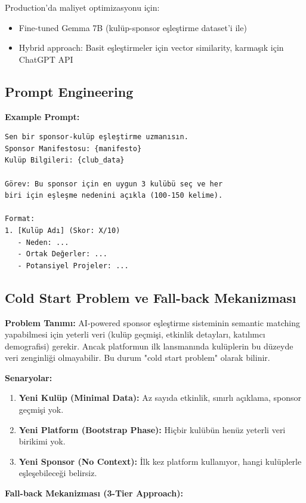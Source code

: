 \documentclass[a4paper,12pt]{report}
\begin{document}
Production'da maliyet optimizasyonu için:
\begin{itemize}
    \item Fine-tuned Gemma 7B (kulüp-sponsor eşleştirme dataset'i ile)
    \item Hybrid approach: Basit eşleştirmeler için vector similarity, karmaşık için ChatGPT API
\end{itemize}

\subsection{Prompt Engineering}

\textbf{Example Prompt:}

\begin{verbatim}
Sen bir sponsor-kulüp eşleştirme uzmanısın.
Sponsor Manifestosu: {manifesto}
Kulüp Bilgileri: {club_data}

Görev: Bu sponsor için en uygun 3 kulübü seç ve her
biri için eşleşme nedenini açıkla (100-150 kelime).

Format:
1. [Kulüp Adı] (Skor: X/10)
   - Neden: ...
   - Ortak Değerler: ...
   - Potansiyel Projeler: ...
\end{verbatim}

\subsection{Cold Start Problem ve Fall-back Mekanizması}

\textbf{Problem Tanımı:} AI-powered sponsor eşleştirme sisteminin semantic matching yapabilmesi için yeterli veri (kulüp geçmişi, etkinlik detayları, katılımcı demografisi) gerekir. Ancak platformun ilk lansmanında kulüplerin bu düzeyde veri zenginliği olmayabilir. Bu durum "cold start problem" olarak bilinir.

\textbf{Senaryolar:}

\begin{enumerate}
    \item \textbf{Yeni Kulüp (Minimal Data):} Az sayıda etkinlik, sınırlı açıklama, sponsor geçmişi yok.
    \item \textbf{Yeni Platform (Bootstrap Phase):} Hiçbir kulübün henüz yeterli veri birikimi yok.
    \item \textbf{Yeni Sponsor (No Context):} İlk kez platform kullanıyor, hangi kulüplerle eşleşebileceği belirsiz.
\end{enumerate}

\textbf{Fall-back Mekanizması (3-Tier Approach):}
\end{document}
